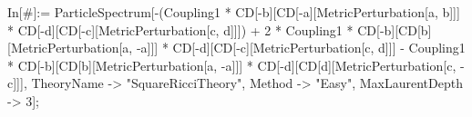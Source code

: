 In[#]:= ParticleSpectrum[-(Coupling1 * CD[-b][CD[-a][MetricPerturbation[a, b]]] * CD[-d][CD[-c][MetricPerturbation[c, d]]]) + 2 * Coupling1 * CD[-b][CD[b][MetricPerturbation[a, -a]]] * CD[-d][CD[-c][MetricPerturbation[c, d]]] - Coupling1 * CD[-b][CD[b][MetricPerturbation[a, -a]]] * CD[-d][CD[d][MetricPerturbation[c, -c]]], TheoryName -> "SquareRicciTheory", Method -> "Easy", MaxLaurentDepth -> 3]; 